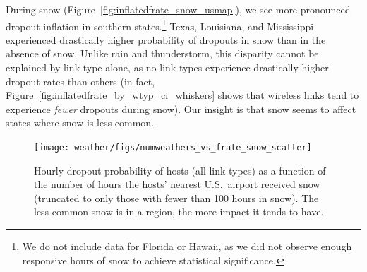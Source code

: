 During snow (Figure~\ref{fig:inflatedfrate_snow_usmap}), we see more
pronounced dropout inflation in southern states.\footnote{We do not
include data for Florida or Hawaii, as we did not
observe enough responsive hours of snow to achieve statistical
significance.}
%
Texas, Louisiana, and Mississippi experienced drastically higher
probability of dropouts in snow than in the absence of snow.
%
Unlike rain and thunderstorm, this disparity cannot be explained by
link type alone, as no link types experience drastically higher dropout
rates than others (in fact,
Figure~\ref{fig:inflatedfrate_by_wtyp_ci_whiskers} shows that wireless
links tend to experience \emph{fewer} dropouts during snow).
%
Our insight is that snow seems to affect states where snow is less
common.






\begin{figure}[t]
\centering
\texttt{[image: weather/figs/numweathers\_vs\_frate\_snow\_scatter]}
\caption[Hourly dropout probability of hosts (all link types) as a
function of the number of hours the hosts' nearest U.S.~airport
received snow]{
\label{fig:numweathers_vs_frate_snow_scatter}
\figdone
	Hourly dropout probability of hosts (all link types) as a function
	of the number of hours the hosts' nearest U.S.~airport received
	snow (truncated to only those with fewer than 100 hours in snow).
	The less common snow is in a region, the more impact it tends to
	have.}
\end{figure}




